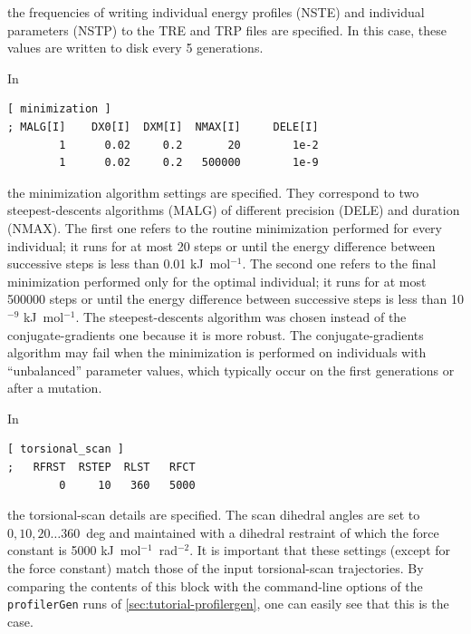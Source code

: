 \documentclass[10pt,a4paper]{report}
\numberwithin{equation}{section}
\newcommand{\profilergen}[0]{\texttt{profilerGen}}
\begin{document}
\noindent the frequencies of writing individual energy profiles (NSTE)
and individual parameters (NSTP) to the TRE and TRP files are
specified.
%
In this case, these values are written to disk every 5 generations.

In

\begin{lstlisting}[language=gromacs]
[ minimization ]
; MALG[I]    DX0[I]  DXM[I]  NMAX[I]     DELE[I]
        1      0.02     0.2       20        1e-2
        1      0.02     0.2   500000        1e-9

\end{lstlisting}\vspace{-2ex}\par

\noindent the minimization algorithm settings are specified.
%
They correspond to two steepest-descents algorithms (MALG) of
different precision (DELE) and duration (NMAX).
%
The first one refers to the routine minimization performed for every
individual; it runs for at most 20 steps or until the energy
difference between successive steps is less than 0.01 kJ~mol$^{-1}$.
%
The second one refers to the final minimization performed only for the
optimal individual; it runs for at most 500000 steps or until the energy
difference between successive steps is less than 10$^{-9}$
kJ~mol$^{-1}$.
%
The steepest-descents algorithm was chosen instead of the
conjugate-gradients one because it is more robust.
%
The conjugate-gradients algorithm may fail when the minimization is
performed on individuals with ``unbalanced'' parameter values, which
typically occur on the first generations or after a mutation.

In

\begin{lstlisting}[language=gromacs]
[ torsional_scan ]
;   RFRST  RSTEP  RLST   RFCT
        0     10   360   5000
\end{lstlisting}\vspace{-2ex}\par

\noindent the torsional-scan details are specified.
%
The scan dihedral angles are set to $0,10,20\ldots 360$~deg and
maintained with a dihedral restraint of which the force constant is
5000 kJ~mol$^{-1}$~rad$^{-2}$.
%
It is important that these settings (except for the force constant)
match those of the input torsional-scan trajectories.
%
By comparing the contents of this block with the command-line options
of the \profilergen{} runs of \autoref{sec:tutorial-profilergen}, one
can easily see that this is the case.
\end{document}
